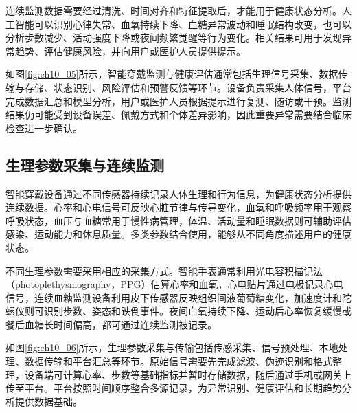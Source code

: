 连续监测数据需要经过清洗、时间对齐和特征提取后，才能用于健康状态分析。人工智能可以识别心律失常、血氧持续下降、血糖异常波动和睡眠结构改变，也可以分析步数减少、活动强度下降或夜间频繁觉醒等行为变化。相关结果可用于发现异常趋势、评估健康风险，并向用户或医护人员提供提示。

如图\ref{fig:ch10_05}所示，智能穿戴监测与健康评估通常包括生理信号采集、数据传输与存储、状态识别、风险评估和预警反馈等环节。设备负责采集人体信号，平台完成数据汇总和模型分析，用户或医护人员根据提示进行复测、随访或干预。监测结果仍可能受到设备误差、佩戴方式和个体差异影响，因此重要异常需要结合临床检查进一步确认。


\par
\noindent\begin{minipage}{\textwidth}
\centering
{}
\label{fig:ch10_05}
\end{minipage}
\par

\subsection{生理参数采集与连续监测}

智能穿戴设备通过不同传感器持续记录人体生理和行为信息，为健康状态分析提供连续数据。心率和心电信号可反映心脏节律与传导变化，血氧和呼吸频率用于观察呼吸状态，血压与血糖常用于慢性病管理，体温、活动量和睡眠数据则可辅助评估感染、运动能力和休息质量。多类参数结合使用，能够从不同角度描述用户的健康状态。

不同生理参数需要采用相应的采集方式。智能手表通常利用光电容积描记法（photoplethysmography，PPG）估算心率和血氧，心电贴片通过电极记录心电信号，连续血糖监测设备利用皮下传感器反映组织间液葡萄糖变化，加速度计和陀螺仪则可识别步数、姿态和跌倒事件。夜间血氧持续下降、运动后心率恢复缓慢或餐后血糖长时间偏高，都可通过连续监测被记录。

如图\ref{fig:ch10_06}所示，生理参数采集与传输包括传感采集、信号预处理、本地处理、数据传输和平台汇总等环节。原始信号需要先完成滤波、伪迹识别和格式整理，设备端可计算心率、步数等基础指标并暂时存储数据，随后通过手机或网关上传至平台。平台按照时间顺序整合多源记录，为异常识别、健康评估和长期趋势分析提供数据基础。

\par
\noindent\begin{minipage}{\textwidth}
\centering
{}
\label{fig:ch10_06}
\end{minipage}
\par

